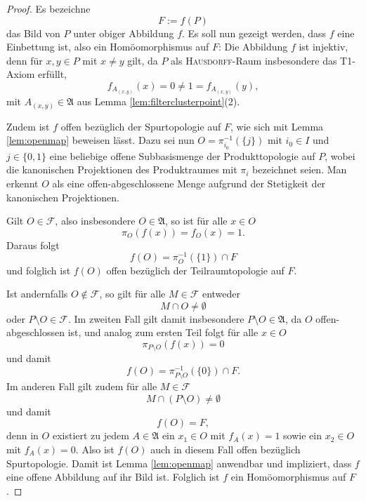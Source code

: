 \begin{proof}
  Es bezeichne 
  \begin{displaymath}
    F := f(P)
  \end{displaymath}
  das Bild von $P$ unter obiger Abbildung $f$.
  Es soll nun gezeigt werden, dass $f$ eine Einbettung ist, also ein Homöomorphismus auf $F$:
  Die Abbildung $f$ ist injektiv, denn für $x,y \in P$ mit $x \neq y$ gilt, da $P$ als \textsc{Hausdorff}\hyp{}Raum insbesondere das T1\hyp{}Axiom erfüllt,
  \begin{displaymath}
    f_{A_{(x,y)}}(x) = 0 \neq 1 = f_{A_{(x,y)}}(y),
  \end{displaymath}
  mit $A_{(x,y)} \in \mathfrak{A}$ aus Lemma \ref{lem:filterclusterpoint}(2).

  Zudem ist $f$ offen bezüglich der Spurtopologie auf $F$, wie sich mit Lemma \ref{lem:openmap} beweisen lässt. 
  Dazu sei nun $O = \pi_{i_0}^{-1}(\{j\})$ mit $i_0 \in I$ und $j \in \{0,1\}$ eine beliebige offene Subbasismenge der Produkttopologie auf $P$,  wobei die kanonischen Projektionen des Produktraumes mit $\pi_i$ bezeichnet seien.
  Man erkennt $O$ als eine offen\hyp{}abgeschlossene Menge aufgrund der Stetigkeit der kanonischen Projektionen.

  Gilt $O \in \mathcal{F}$, also insbesondere $O \in \mathfrak{A}$, so ist für alle $x \in O$
  \begin{displaymath}
    \pi_O(f(x)) = f_O(x) = 1.
  \end{displaymath}
  Daraus folgt 
  \begin{displaymath}
    f(O) = \pi_O^{-1}(\{1\}) \cap F
  \end{displaymath}
  und folglich ist $f(O)$ offen bezüglich der Teilraumtopologie auf $F$.

  Ist andernfalls $O \not\in \mathcal{F}$, so gilt für alle $M \in \mathcal{F}$ entweder
  \begin{displaymath}
    M \cap O \neq \emptyset
  \end{displaymath}
  oder $P \setminus O \in \mathcal{F}$.
  Im zweiten Fall gilt damit insbesondere $P \setminus O \in \mathfrak{A}$, da $O$ offen\hyp{}abgeschlossen ist, und analog zum ersten Teil folgt für alle $x \in O$
  \begin{displaymath}
    \pi_{P \setminus O}(f(x)) = 0
  \end{displaymath}
  und damit 
  \begin{displaymath}
    f(O) = \pi_{P \setminus O}^{-1}(\{0\}) \cap F.
  \end{displaymath}
  Im anderen Fall gilt zudem für alle $M \in \mathcal{F}$
  \begin{displaymath}
    M \cap (P \setminus O) \neq \emptyset
  \end{displaymath}
  und damit 
  \begin{displaymath}
    f(O) = F,
  \end{displaymath}
  denn in $O$ existiert zu jedem $A \in \mathfrak{A}$ ein $x_1 \in O$ mit $f_A(x) = 1$ sowie ein $x_2 \in O$ mit $f_A(x) = 0$.
  Also ist $f(O)$ auch in diesem Fall offen bezüglich Spurtopologie.  
  Damit ist Lemma \ref{lem:openmap} anwendbar und impliziert, dass $f$ eine offene Abbildung auf ihr Bild ist.
  Folglich ist $f$ ein Homöomorphismus auf $F$.


\end{proof}
